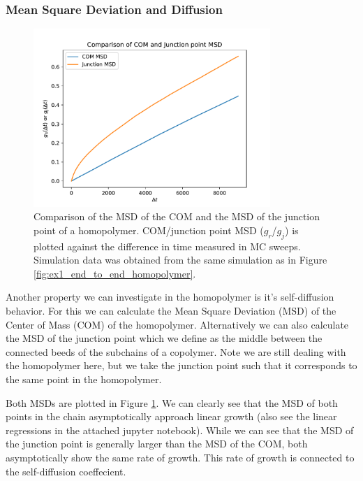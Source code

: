 \documentclass[../main.tex]{subfiles}
\begin{document}
\subsubsection{Mean Square Deviation and Diffusion}

\begin{figure}[htpb]
    \centering
    \includegraphics[width=0.8\textwidth]{../figures/ex1_msd_comparison.pdf}
    \caption{
        Comparison of the MSD of the COM and the MSD of the junction point of a homopolymer.
        COM/junction point MSD ($g_r$/$g_j$) is plotted against the difference in time measured in MC sweeps.
        Simulation data was obtained from the same simulation as in Figure \ref{fig:ex1_end_to_end_homopolymer}.
    }
    \label{fig:ex1_msd_comparison}
\end{figure}

Another property we can investigate in the homopolymer is it's self-diffusion behavior.
For this we can calculate the Mean Square Deviation (MSD) of the Center of Mass (COM) of the homopolymer.
Alternatively we can also calculate the MSD of the junction point which we define as the middle between the connected beeds of the subchains of a copolymer.
Note we are still dealing with the homopolymer here, but we take the junction point such that it corresponds to the same point in the homopolymer.
\par

Both MSDs are plotted in Figure \ref{fig:ex1_msd_comparison}.
We can clearly see that the MSD of both points in the chain asymptotically approach linear growth (also see the linear regressions in the attached jupyter notebook).
While we can see that the MSD of the junction point is generally larger than the MSD of the COM, both asymptotically show the same rate of growth.
This rate of growth is connected to the self-diffusion coeffecient.
\par
\end{document}
